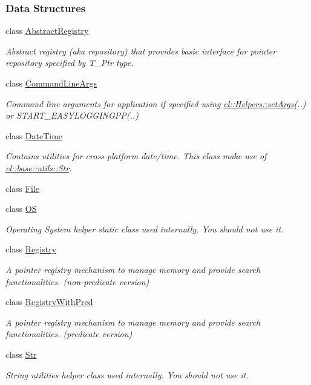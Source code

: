 \subsubsection*{Data Structures}
\begin{DoxyCompactItemize}
\item 
class \hyperlink{a00004}{Abstract\+Registry}
\begin{DoxyCompactList}\small\item\em Abstract registry (aka repository) that provides basic interface for pointer repository specified by T\+\_\+\+Ptr type. \end{DoxyCompactList}\item 
class \hyperlink{a00009}{Command\+Line\+Args}
\begin{DoxyCompactList}\small\item\em Command line arguments for application if specified using \hyperlink{a00035_a68748f618a0c2840b96dc12532b09bf0}{el\+::\+Helpers\+::set\+Args}(..) or S\+T\+A\+R\+T\+\_\+\+E\+A\+S\+Y\+L\+O\+G\+G\+I\+N\+G\+P\+P(..) \end{DoxyCompactList}\item 
class \hyperlink{a00022}{Date\+Time}
\begin{DoxyCompactList}\small\item\em Contains utilities for cross-\/platform date/time. This class make use of \hyperlink{a00087}{el\+::base\+::utils\+::\+Str}. \end{DoxyCompactList}\item 
class \hyperlink{a00030}{File}
\item 
class \hyperlink{a00063}{O\+S}
\begin{DoxyCompactList}\small\item\em Operating System helper static class used internally. You should not use it. \end{DoxyCompactList}\item 
class \hyperlink{a00073}{Registry}
\begin{DoxyCompactList}\small\item\em A pointer registry mechanism to manage memory and provide search functionalities. (non-\/predicate version) \end{DoxyCompactList}\item 
class \hyperlink{a00074}{Registry\+With\+Pred}
\begin{DoxyCompactList}\small\item\em A pointer registry mechanism to manage memory and provide search functionalities. (predicate version) \end{DoxyCompactList}\item 
class \hyperlink{a00087}{Str}
\begin{DoxyCompactList}\small\item\em String utilities helper class used internally. You should not use it. \end{DoxyCompactList}\end{DoxyCompactItemize}
